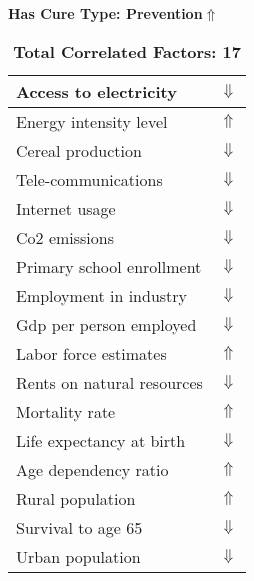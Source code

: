 \documentclass[12pt,notitlepage,oneside]{report}
\begin{document}
\begin{table}[!htb]
\caption{\textbf{Has Cure Type: Prevention$ \Uparrow$}}
\centering
\label{Correlated Socio-economic Factors0}
\begin{tabular}{|l|l|}
\hline
Access to electricity & $\Downarrow$\\ \hline
Energy intensity level & $\Uparrow$\\ \hline
Cereal production & $\Downarrow$\\ \hline
Tele-communications & $\Downarrow$\\ \hline
Internet usage & $\Downarrow$\\ \hline
Co2 emissions & $\Downarrow$\\ \hline
Primary school enrollment & $\Downarrow$\\ \hline
Employment in industry & $\Downarrow$\\ \hline
Gdp per person employed & $\Downarrow$\\ \hline
Labor force estimates & $\Uparrow$\\ \hline
Rents on natural resources & $\Downarrow$\\ \hline
Mortality rate & $\Uparrow$\\ \hline
Life expectancy at birth & $\Downarrow$\\ \hline
Age dependency ratio & $\Uparrow$\\ \hline
Rural population & $\Uparrow$\\ \hline
Survival to age 65 & $\Downarrow$\\ \hline
Urban population & $\Downarrow$\\ \hline
\end{tabular}
\caption*{\textbf{Total Correlated Factors: 17}}
\end{table}
\end{document}
